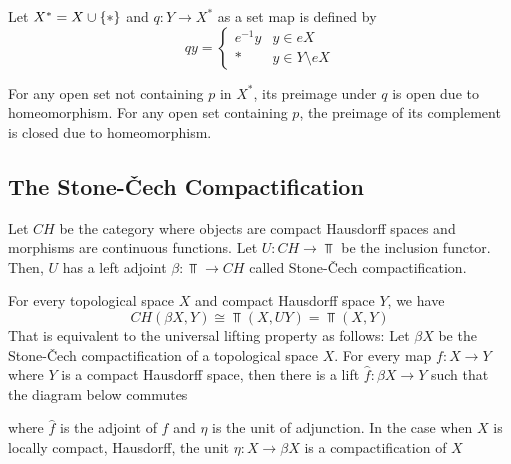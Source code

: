 \documentclass{article}
\begin{document}
\begin{longproof}
    Let $X^* = X \cup \{*\}$ and $q: Y \to X^*$ as a set map is defined by
    $$
        q y = \begin{cases}
            e^{-1} y &\text{$y \in eX$}\\
            * &\text{$y \in Y \setminus eX$}
        \end{cases}
    $$

    For any open set not containing $p$ in $X^*$, its preimage under $q$ is open due to homeomorphism. For any open set containing $p$, the preimage of its complement is closed due to homeomorphism.
\end{longproof}

\subsection{The Stone-Čech Compactification}

\begin{definition}
    Let $CH$ be the category where objects are compact Hausdorff spaces and morphisms are continuous functions. Let $U: CH \to \Top$ be the inclusion functor. Then, $U$ has a left adjoint $\beta: \Top \to CH$ called Stone-Čech compactification.
\end{definition}

\begin{remark}
    For every topological space $X$ and compact Hausdorff space $Y$, we have
    $$
        CH(\beta X, Y) \cong \Top(X, UY) = \Top(X, Y)
    $$
    That is equivalent to the universal lifting property as follows: Let $\beta X$ be the Stone-Čech compactification of a topological space $X$. For every map $f: X \to Y$ where $Y$ is a compact Hausdorff space, then there is a lift $\hat{f}: \beta X \to Y$ such that the diagram below commutes
    \begin{center}
    \end{center}

    where $\hat{f}$ is the adjoint of $f$ and $\eta$ is the unit of adjunction. In the case when $X$ is locally compact, Hausdorff, the unit $\eta: X \to \beta X$ is a compactification of $X$
\end{remark}
\end{document}
